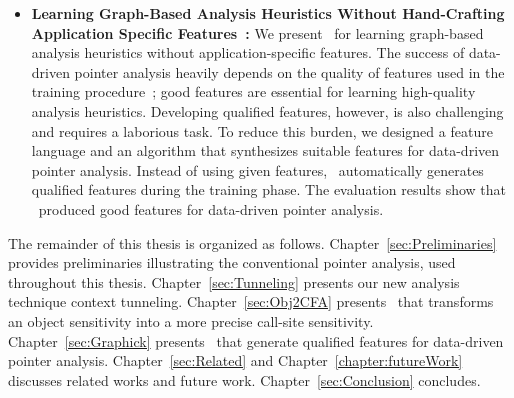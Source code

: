 \begin{itemize}
\item {\bf Learning Graph-Based Analysis Heuristics Without Hand-Crafting Application Specific Features~\cite{Graphick20}:}
We present \ourtool~for learning graph-based analysis heuristics without application-specific features.
The success of data-driven pointer analysis heavily depends on the quality of features used in the training procedure~\cite{JeJeChOh17,ChOhHeYa17}; good features are essential for learning high-quality analysis heuristics.
Developing qualified features, however, is also challenging and requires a laborious task.
To reduce this burden, we designed a feature language and an algorithm that synthesizes suitable features for data-driven pointer analysis.
Instead of using given features, \ourtool~automatically generates qualified features during the training phase. The evaluation results show that \ourtool~produced good features for data-driven pointer analysis.



\end{itemize}


The remainder of this thesis is organized as follows.
Chapter~{\ref{sec:Preliminaries}} provides preliminaries illustrating the conventional pointer analysis, used throughout this thesis.
Chapter~{\ref{sec:Tunneling}} presents our new analysis technique context tunneling. 
Chapter~{\ref{sec:Obj2CFA}} presents \ourtechnique~that transforms an object sensitivity into a more precise call-site sensitivity.
Chapter~{\ref{sec:Graphick}} presents \ourtool~that generate qualified features for data-driven pointer analysis.
Chapter~{\ref{sec:Related}} and Chapter~{\ref{chapter:futureWork}} discusses related works and future work. 
Chapter~{\ref{sec:Conclusion}} concludes.




